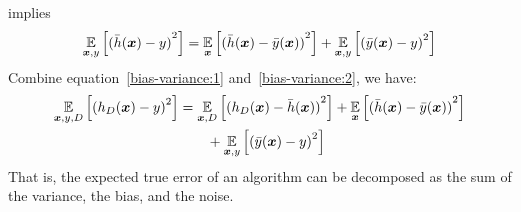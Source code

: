 implies
\begin{equation}\label{bias-variance:2}
    \operatorname*{\mathbb{E}}_{\boldsymbol{x}, y}\left[{(\bar{h}(\boldsymbol{x}) - y)}^2\right] =
    \operatorname*{\mathbb{E}}_{\boldsymbol{x}}\left[{(\bar{h}(\boldsymbol{x}) - \bar{y}(\boldsymbol{x}))}^2\right]
    + \operatorname*{\mathbb{E}}_{\boldsymbol{x}, y}\left[{(\bar{y}(\boldsymbol{x}) - y)}^2\right]
\end{equation}
Combine equation~\eqref{bias-variance:1} and~\eqref{bias-variance:2}, we have:
\begin{equation}\begin{split}
    \operatorname*{\mathbb{E}}_{\boldsymbol{x}, y, D}\left[{(h_D(\boldsymbol{x}) - y)}^2\right] &= \operatorname*{\mathbb{E}}_{\boldsymbol{x}, D} \left[{(h_D(\boldsymbol{x}) -
    \bar{h}(\boldsymbol{x}))}^2\right] + \operatorname*{\mathbb{E}}_{\boldsymbol{x}}\left[{(\bar{h}(\boldsymbol{x}) - \bar{y}(\boldsymbol{x}))}^2\right]\\
    &\quad\quad+ \operatorname*{\mathbb{E}}_{\boldsymbol{x}, y}\left[{(\bar{y}(\boldsymbol{x}) - y)}^2\right]
\end{split}\end{equation}
That is, the expected true error of an algorithm can be decomposed as the sum of the variance, the bias, and
the noise.